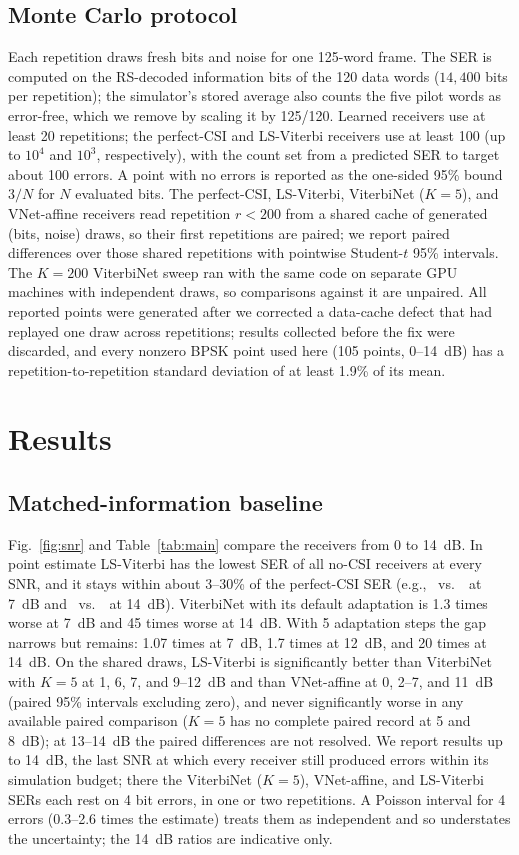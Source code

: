 \documentclass[journal]{IEEEtran}
\begin{document}
\subsection{Monte Carlo protocol}
Each repetition draws fresh bits and noise for one 125-word frame. The SER is computed on the RS-decoded information bits of the 120 data words ($14{,}400$ bits per repetition); the simulator's stored average also counts the five pilot words as error-free, which we remove by scaling it by 125/120. Learned receivers use at least 20 repetitions; the perfect-CSI and LS-Viterbi receivers use at least 100 (up to $10^4$ and $10^3$, respectively), with the count set from a predicted SER to target about 100 errors. A point with no errors is reported as the one-sided 95\% bound $3/N$ for $N$ evaluated bits. The perfect-CSI, LS-Viterbi, ViterbiNet ($K=5$), and VNet-affine receivers read repetition $r<200$ from a shared cache of generated (bits, noise) draws, so their first repetitions are paired; we report paired differences over those shared repetitions with pointwise Student-$t$ 95\% intervals. The $K=200$ ViterbiNet sweep ran with the same code on separate GPU machines with independent draws, so comparisons against it are unpaired. All reported points were generated after we corrected a data-cache defect that had replayed one draw across repetitions; results collected before the fix were discarded, and every nonzero BPSK point used here (105 points, 0--14~dB) has a repetition-to-repetition standard deviation of at least 1.9\% of its mean.

\section{Results}\label{sec:results}
\subsection{Matched-information baseline}
Fig.~\ref{fig:snr} and Table~\ref{tab:main} compare the receivers from 0 to 14~dB. In point estimate LS-Viterbi has the lowest SER of all no-CSI receivers at every SNR, and it stays within about 3--30\% of the perfect-CSI SER (e.g., \serlsseven\ vs.\ \sercsiseven\ at 7~dB and \serlsfourteen\ vs.\ \sercsifourteen\ at 14~dB). ViterbiNet with its default adaptation is 1.3 times worse at 7~dB and 45 times worse at 14~dB. With 5 adaptation steps the gap narrows but remains: 1.07 times at 7~dB, 1.7 times at 12~dB, and 20 times at 14~dB. On the shared draws, LS-Viterbi is significantly better than ViterbiNet with $K=5$ at 1, 6, 7, and 9--12~dB and than VNet-affine at 0, 2--7, and 11~dB (paired 95\% intervals excluding zero), and never significantly worse in any available paired comparison ($K=5$ has no complete paired record at 5 and 8~dB); at 13--14~dB the paired differences are not resolved. We report results up to 14~dB, the last SNR at which every receiver still produced errors within its simulation budget; there the ViterbiNet ($K=5$), VNet-affine, and LS-Viterbi SERs each rest on 4 bit errors, in one or two repetitions. A Poisson interval for 4 errors (0.3--2.6 times the estimate) treats them as independent and so understates the uncertainty; the 14~dB ratios are indicative only.
\end{document}

